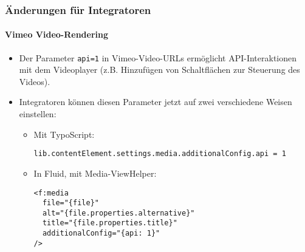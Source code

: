 
\begin{frame}[fragile]
	\frametitle{Änderungen für Integratoren}
	\framesubtitle{Vimeo Video-Rendering}

	\lstset{basicstyle=\smaller\ttfamily}

	\begin{itemize}
		\item Der Parameter \texttt{api=1} in Vimeo-Video-URLs ermöglicht API-Interaktionen mit dem Videoplayer (z.B. Hinzufügen von Schaltflächen zur Steuerung des Videos).
		\item Integratoren können diesen Parameter jetzt auf zwei verschiedene Weisen einstellen:

		\begin{itemize}
			\item Mit TypoScript:

\begin{lstlisting}
lib.contentElement.settings.media.additionalConfig.api = 1
\end{lstlisting}

			\item In Fluid, mit Media-ViewHelper:

\begin{lstlisting}
<f:media
  file="{file}"
  alt="{file.properties.alternative}"
  title="{file.properties.title}"
  additionalConfig="{api: 1}"
/>
\end{lstlisting}

		\end{itemize}
	\end{itemize}

\end{frame}



